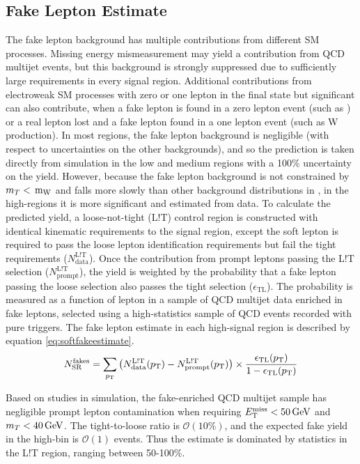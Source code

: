 \subsection{Fake Lepton Estimate}
\label{subsec:softfakeestimate}
The fake lepton background has multiple contributions from different SM processes. Missing energy mismeasurement may yield a contribution from QCD multijet events, but this background is strongly suppressed due to sufficiently large \MET requirements in every signal region. Additional contributions from electroweak SM processes with zero or one lepton in the final state but significant \MET can also contribute, when a fake lepton is found in a zero lepton event (such as \znunu) or a real lepton lost and a fake lepton found in a one lepton event (such as W production). In most regions, the fake lepton background is negligible (with respect to uncertainties on the other backgrounds), and so the prediction is taken directly from simulation in the low and medium \mt regions with a 100\% uncertainty on the yield. However, because the fake lepton background is not constrained by $m_T < \,\text{m}_{\text{W}}$ and falls more slowly than other background distributions in \mt, in the high-\mt regions it is more significant and estimated from data. To calculate the predicted yield, a loose-not-tight (L!T) control region is constructed with identical kinematic requirements to the signal region, except the soft lepton is required to pass the loose lepton identification requirements but fail the tight requirements ($N_{\text{data}}^{\text{L!T}}$). Once the contribution from prompt leptons passing the L!T selection ($N_{\text{prompt}}^{\text{L!T}}$), the yield is weighted by the probability that a fake lepton passing the loose selection also passes the tight selection ($\epsilon_{\text{TL}}$). The probability is measured as a function of lepton \pt in a sample of QCD multijet data enriched in fake leptons, selected using a high-statistics sample of QCD events recorded with pure \HT triggers. The fake lepton estimate in each high-\mt signal region is described by equation \ref{eq:softfakeestimate}.
\begin{equation}
	N_{\text{SR}}^{\text{fakes}} = \sum_{p_{\mathrm{T}}} \left( N_{\text{data}}^{\text{L!T}}(p_{\mathrm{T}}) - N_{\text{prompt}}^{\text{L!T}}(p_{\mathrm{T}}) \right) \times \frac{\epsilon_{\text{TL}}(p_{\mathrm{T}})}{1-\epsilon_{\text{TL}}(p_{\mathrm{T}})}
	\label{eq:softfakeestimate}
\end{equation}

Based on studies in simulation, the fake-enriched QCD multijet sample has negligible prompt lepton contamination when requiring $E_{\mathrm{T}}^{\text{miss}} < 50\,\text{Ge\hspace{-.08em}V}$ and $m_T < 40\,\text{Ge\hspace{-.08em}V}$. The tight-to-loose ratio is $\mathcal{O}(10\%)$, and the expected fake yield in the high-\mt bin is $\mathcal{O}(1)$ events. Thus the estimate is dominated by statistics in the L!T region, ranging between 50-100\%.

